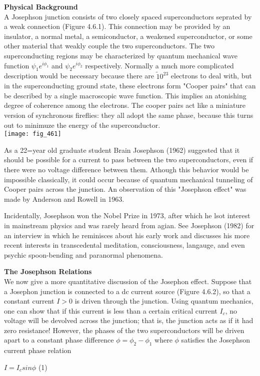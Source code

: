 \documentclass{article}
\newcommand\tab[1][1cm]{\hspace*{#1}}
\begin{document}
\textbf {Physical Background} \\ \tab
A Josephson junction consists of two closely spaced superconductors seprated by a weak connection (Figure 4.6.1). This connection may be provided by an insulator, a normal metal, a semiconductor, a weakened superconductor, or some other material that weakly couple the two superconductors. The two superconducting regions may be characterized by quantum mechanical wave function $\psi_{1}e^{i\phi_{1}}$ and $\psi_{2}e^{i\phi_{2}}$ respectively. Normally a much more complicated description would be necessary because there are $\tilde 10^{23}$ electrons to deal with, but in the superconducting ground state, these electrons form "Cooper pairs" that can be described by a single macroscopic wave function. This implies an atonishing degree of coherence among the electrons. The cooper pairs act like a miniature version of synchronous fireflies: they all adopt the same phase, because this turns out to minimuze the energy of the superconductor. \\
\texttt{[image: fig\_461]}

As a 22=year old graduate student Brain Josephson (1962) suggested that it should be possible for a current to pass between the two superconductors, even if there were no voltage difference between them. Athough this behavior would be impossible classically, it could occur because of quantum mechanical tunneling of Cooper pairs across the junction. An observation of this "Josephson effect" was made by Anderson and Rowell in 1963. \\ \tab

Incidentally, Josephson won the Nobel Prize in 1973, after which he lsot interest in mainstream physics and was rarely heard from agian. See Josephson (1982) for an interview in which he reminisces about his early work and discusses his more recent interests in transcedental meditation, consciousness, langauge, and even psychic spoon-bending and paranormal phenomena. 


\textbf {The Josephson Relations} \\ \tab
We now give a more quantitative discussion of the Josephon effect. Suppose that a Josephon junction is connected to a dc current source (Figure 4.6.2), so that a constant current $I>0$ is driven through the junction. Using quantum mechanics, one can show that if this current is less than a certain critical current $I_{c}$, no voltage will be devolved across the junction; that is, the junction acts as if it had zero resistance! However, the phases of the two superconductors will be driven apart to a constant phase difference $\phi=\phi_{2}-\phi_{1}$ where $\phi$ satisfies the Josephson current phase relation
\begin{center}
$I=I_{c}sin\phi$ \tab (1)
\end{center}
\end{document}
